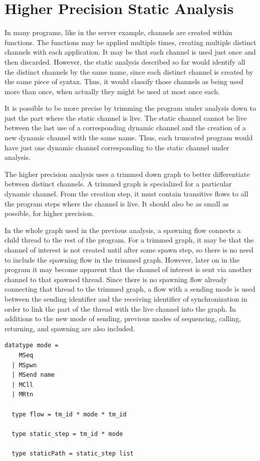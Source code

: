 \documentclass[letterpaper, 11pt]{report}
\begin{document}
\chapter{Higher Precision Static Analysis} \label{high-precision}
In many programs, like in the server example, channels are created within functions.
The functions may be applied multiple times, creating multiple distinct channels
with each application. It may be that each channel is used just once and then discarded.
However, the static analysis described so far would identify all the distinct channels by the
same name, since each distinct channel is created by the same piece of syntax.
Thus, it would classify those channels as being used more than once,
when actually they might be used at most once each.

It is possible to be more precise by trimming the program under analysis down to just the part
where the static channel is live. The static channel cannot be live between the last use of a
corresponding dynamic channel and the creation of a new dynamic channel with the same name. Thus, each
truncated program would have just one dynamic channel corresponding to the static channel under
analysis. 

The higher precision analysis uses a trimmed down graph to better differentiate between distinct channels. 
A trimmed graph is specialized for a particular dynamic channel. From the creation
step, it must contain transitive flows to all the program steps where the
channel is live. It should also be as small as possible, for higher precision.

In the whole graph used in the previous analysis, a spawning flow
connects a child thread to the rest of the program. For a trimmed graph,
it may be that the channel of interest is not created until after some spawn step,
so there is no need to include the spawning flow in the trimmed graph. However, later on in the
program it may become apparent that the channel of interest is sent via another channel to
that spawned thread. Since there is no spawning flow already connecting that
thread to the trimmed graph, a flow with a sending mode is used between the
sending identifier and the receiving identifier of synchronization
in order to link the part of the thread with the live channel into the graph.
In additions to the new mode of sending, previous modes of
sequencing, calling, returning, and spawning are also included.

\begin{lstlisting}[language=logic, mathescape]
  datatype mode =
    MSeq
  | MSpwn
  | MSend name
  | MCll
  | MRtn

  type flow = tm_id * mode * tm_id

  type static_step = tm_id * mode

  type staticPath = static_step list
\end{lstlisting}
\end{document}
